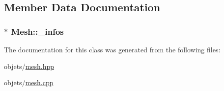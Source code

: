 \subsection{Member Data Documentation}
\hypertarget{class_mesh_a608911b8dbff58ff769c708b8b7f2618}{
\subsubsection[{\+\_\+infos}]{$\ast$ Mesh\+::\+\_\+infos\hspace{0.3cm}{\ttfamily [private]}}}\label{class_mesh_a608911b8dbff58ff769c708b8b7f2618}


The documentation for this class was generated from the following files\+:\begin{DoxyCompactItemize}
\item 
objets/\hyperlink{mesh_8hpp}{mesh.\+hpp}\item 
objets/\hyperlink{mesh_8cpp}{mesh.\+cpp}\end{DoxyCompactItemize}

